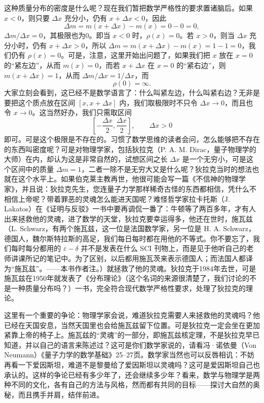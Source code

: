 这种质量分布的密度是什么呢？现在我们暂把数学严格性的要求置诸脑后。如果 $x<0$，则只要 $\Delta x$ 充分小，仍有 $x+\Delta x<0$，因此
\[
\Delta m=m(x+\Delta x)-m(x)=0-0=0,
\]
$\Delta m/\Delta x=0$，其极限也为0。即当 $x<0$ 时，$\rho(x)=0$。若 $x>0$，则当 $\Delta x$ 充分小时，仍有 $x+\Delta x>0$，所以 $\Delta m=m(x+\Delta x)-m(x)=1-1=0$，我们仍有 $\rho(x)=0$。可是，注意，这里开始出问题了，如果我们把 $x$ 放在 $x=0$ 的“紧左边”，从而 $m(x)=0$，而若 $x+\Delta x$ 在 $x=0$ 的“紧右边”，则 $m(x+\Delta x)=1$，从而 $\Delta m/\Delta x=1/\Delta x$，而
\[
\rho(0)=\infty.
\]
大家立刻会看到，这已经不是数学语言了：什么叫紧左边，什么叫紧右边？无非是要把这个质点放在区间 $[x,x+\Delta x]$ 内，我们取极限时不只令 $\Delta x\to0$，而且也令 $x\to0$。这当然好办，我们只需取区间
\[
\left[-\frac{\Delta x}{2},\frac{\Delta x}{2}\right],\qquad \Delta x>0
\]
即可。可是这个极限是不存在的。习惯了数学思维的读者会问，怎么能够把不存在的东西叫密度呢？可是对物理学家，包括狄拉克（P. A. M. Dirac，量子物理学的大师）在内，却认为这是非常自然的，试想区间之长 $\Delta x$ 是一个无穷小，可是这个区间中的质量 $\Delta m=1$，二者一除不是无穷大又是什么呢？狄拉克当时的想法也就在这个水平上。如果伯克莱主教再世，他很可能会写一篇《不信神的物理学家》，并且说：狄拉克先生，您连量子力学那样稀奇古怪的东西都相信，凭什么不相信上帝呢？带着罪恶的灵魂怎么能进天国呢？难怪哲学家拉卡托斯（J. Lakatos）在《证明与反驳》一书中要再调侃一番了：牛顿等了两百多年，才有人出来拯救他的灵魂，进了数学的天堂，狄拉克要幸运得多，他还在世时，施瓦兹（L. Schwarz，有两个施瓦兹，这一位是法国数学家，另一位是 H. A. Schwarz，德国人，魏尔斯特拉斯的高足，我们每日每时都在用他的不等式。你不要忘了，我们每时每分都用的 $\varepsilon-\delta$ 并不是发表在什么 SCI 刊物上，而是见于他听自己的老师讲课所记的笔记中。为了区别，以后都用施瓦茨来表示德国人；而法国人都译为“施瓦兹”。——本书作者注。）就拯救了他的灵魂。狄拉克于1984年去世，可是施瓦兹在1950年就发表了《分布理论》（这个名词的来源很清楚了，我们讨论的不是一种质量分布吗？）一书，完全符合现代数学严格性要求，处理了狄拉克的理论。

这里有一个重要的争论：物理学家会说，难道狄拉克需要人来拯救他的灵魂吗？他已经在天国安息，当然天国里也会给施瓦兹留下位置。可是狄拉克一定会坐在更加紧靠上帝的椅子上。施瓦兹的“灵魂”的一部分，即施瓦兹核定理，不是狄拉克早已知道，并以自己的语言来陈述过？这可是你们数学家说的，请看冯·诺依曼（Von Neumann）《量子力学的数学基础》25--27页。数学家当然也可以反唇相讥：不妨再看一下爱因斯坦，难道不是黎曼给了爱因斯坦以灵魂吗？这可是爱因斯坦自己也承认的。这样的争论已经有多少年了，还会继续多少年？看来，数学与物理学是两种不同的文化，各有自己的方法与风格，然而都有共同的目标——探讨大自然的奥秘，而且携手并肩，结伴前进。


